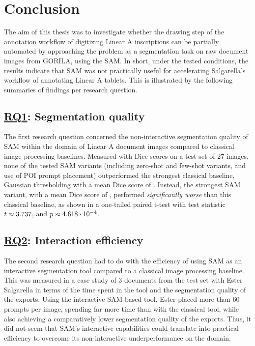 \chapter{Conclusion}
The aim of this thesis was to investigate whether the drawing step of the annotation workflow of digitizing Linear A inscriptions can be partially automated by approaching the problem as a segmentation task on raw document images from \acs{GORILA}, using the \acf{SAM}.
In short, under the tested conditions, the results indicate that \acs{SAM} was not practically useful for accelerating Salgarella's workflow of annotating Linear A tablets.
This is illustrated by the following summaries of findings per research question.

\section{\hyperref[rq1]{\acs{RQ}1}: Segmentation quality}
The first research question concerned the non-interactive segmentation quality of \acs{SAM} within the domain of Linear A document images compared to classical image processing baselines.
Measured with \acs{Dice} scores on a test set of 27 images, none of the tested \acs{SAM} variants (including zero-shot and few-shot variants, and use of \acs{POI} prompt placement) outperformed the strongest classical baseline, \acs{Gaussian} thresholding with a mean \acs{Dice} score of .
Instead, the strongest \acs{SAM} variant, with a mean \acs{Dice} score of , performed \textit{significantly worse} than this classical baseline, as shown in a one-tailed paired t-test with test statistic $t\approx \pgfmathprintnumber[fixed,precision=3]{3.73744358804111}$, and $p \approx \pgfmathprintnumber[sci,precision=3]{0.0004618332770736502}$.

\section{\hyperref[rq2]{\acs{RQ}2}: Interaction efficiency}
The second research question had to do with the efficiency of using \acs{SAM} as an interactive segmentation tool compared to a classical image processing baseline.
This was measured in a case study of 3 documents from the test set with Ester Salgarella in terms of the time spent in the tool and the segmentation quality of the exports.
Using the interactive \acs{SAM}-based tool, Ester placed more than 60 prompts per image, spending far more time than with the classical tool, while also achieving a comparatively lower segmentation quality of the exports.
Thus, it did not seem that \acs{SAM}'s interactive capabilities could translate into practical efficiency to overcome its non-interactive underperformance on the domain.

